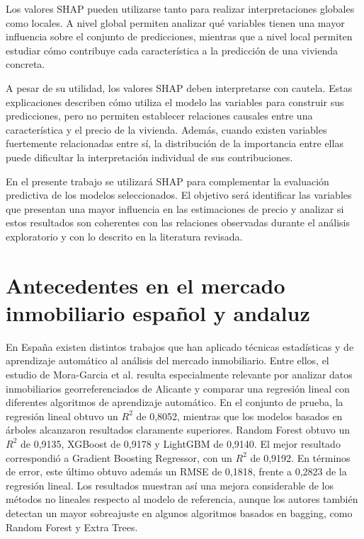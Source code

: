 \documentclass[IB]{TFUOC}%
\begin{document}
Los valores SHAP pueden utilizarse tanto para realizar interpretaciones globales como locales. A nivel global permiten analizar qué variables tienen una mayor influencia sobre el conjunto de predicciones, mientras que a nivel local permiten estudiar cómo contribuye cada característica a la predicción de una vivienda concreta.

A pesar de su utilidad, los valores SHAP deben interpretarse con cautela. Estas explicaciones describen cómo utiliza el modelo las variables para construir sus predicciones, pero no permiten establecer relaciones causales entre una característica y el precio de la vivienda. Además, cuando existen variables fuertemente relacionadas entre sí, la distribución de la importancia entre ellas puede dificultar la interpretación individual de sus contribuciones.

En el presente trabajo se utilizará SHAP para complementar la evaluación predictiva de los modelos seleccionados. El objetivo será identificar las variables que presentan una mayor influencia en las estimaciones de precio y analizar si estos resultados son coherentes con las relaciones observadas durante el análisis exploratorio y con lo descrito en la literatura revisada.

\section{Antecedentes en el mercado inmobiliario español y andaluz}

En España existen distintos trabajos que han aplicado técnicas estadísticas y de aprendizaje automático al análisis del mercado inmobiliario. Entre ellos, el estudio de Mora-Garcia et al. \cite{moragarcia2022housing} resulta especialmente relevante por analizar datos inmobiliarios georreferenciados de Alicante y comparar una regresión lineal con diferentes algoritmos de aprendizaje automático. En el conjunto de prueba, la regresión lineal obtuvo un $R^2$ de 0,8052, mientras que los modelos basados en árboles alcanzaron resultados claramente superiores. Random Forest obtuvo un $R^2$ de 0,9135, XGBoost de 0,9178 y LightGBM de 0,9140. El mejor resultado correspondió a Gradient Boosting Regressor, con un $R^2$ de 0,9192. En términos de error, este último obtuvo además un RMSE de 0,1818, frente a 0,2823 de la regresión lineal. Los resultados muestran así una mejora considerable de los métodos no lineales respecto al modelo de referencia, aunque los autores también detectan un mayor sobreajuste en algunos algoritmos basados en bagging, como Random Forest y Extra Trees.
\end{document}
